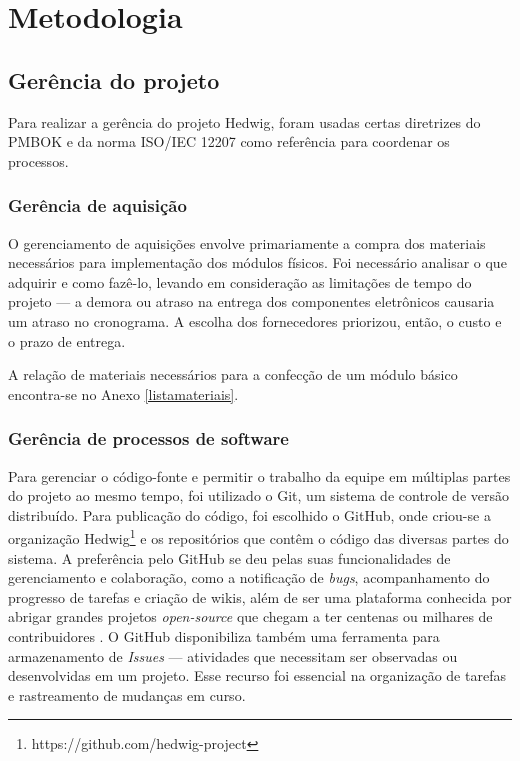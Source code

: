 \chapter{Metodologia}

\section{Gerência do projeto}
Para realizar a gerência do projeto Hedwig, foram usadas certas diretrizes do PMBOK \cite{pmi} e da norma ISO/IEC 12207 \cite{iso12207} como referência para coordenar os processos.


\subsection{Gerência de aquisição}

O gerenciamento de aquisições envolve primariamente a compra dos materiais necessários para implementação dos módulos físicos. Foi necessário analisar o que adquirir e como fazê-lo, levando em consideração as limitações de tempo do projeto --- a demora ou atraso na entrega dos componentes eletrônicos causaria um atraso no cronograma. A escolha dos fornecedores priorizou, então, o custo e o prazo de entrega.

A relação de materiais necessários para a confecção de um módulo básico encontra-se no Anexo \ref{listamateriais}.

\subsection{Gerência de processos de software}

Para gerenciar o código-fonte e permitir o trabalho da equipe em múltiplas partes do projeto ao mesmo tempo, foi utilizado o Git, um sistema de controle de versão distribuído. Para publicação do código, foi escolhido o GitHub, onde criou-se a organização Hedwig\footnote{https://github.com/hedwig-project} e os repositórios que contêm o código das diversas partes do sistema. A preferência pelo GitHub se deu pelas suas funcionalidades de gerenciamento e colaboração, como a notificação de \emph{bugs}, acompanhamento do progresso de tarefas e criação de wikis, além de ser uma plataforma conhecida por abrigar grandes projetos \emph{open-source} que chegam a ter centenas ou milhares de contribuidores \cite{github}. O GitHub disponibiliza também uma ferramenta para armazenamento de \emph{Issues} --- atividades que necessitam ser observadas ou desenvolvidas em um projeto. Esse recurso foi essencial na organização de tarefas e rastreamento de mudanças em curso.

